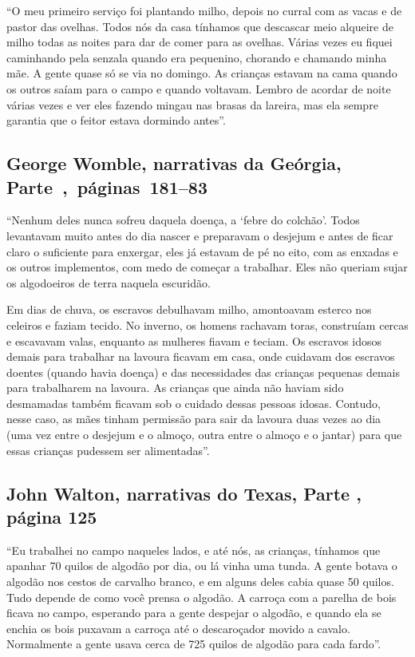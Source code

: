 ``O meu primeiro serviço foi plantando milho, depois no curral com as
vacas e de pastor das ovelhas. Todos nós da casa tínhamos que descascar
meio alqueire de milho todas as noites para dar de comer para as
ovelhas. Várias vezes eu fiquei caminhando pela senzala quando era
pequenino, chorando e chamando minha mãe. A gente quase só se via no
domingo. As crianças estavam na cama quando os outros saíam para o campo
e quando voltavam. Lembro de acordar de noite várias vezes e ver eles
fazendo mingau nas brasas da lareira, mas ela sempre garantia que o
feitor estava dormindo antes''.

\subsection{George Womble, narrativas da Geórgia, Parte~,~páginas~181--83}
\label{ref306}

``Nenhum deles nunca sofreu daquela doença, a `febre do colchão'. Todos
levantavam muito antes do dia nascer e preparavam o desjejum e antes de
ficar claro o suficiente para enxergar, eles já estavam de pé no eito,
com as enxadas e os outros implementos, com medo de começar a trabalhar.
Eles não queriam sujar os algodoeiros de terra naquela escuridão.

Em dias de chuva, os escravos debulhavam milho, amontoavam esterco nos
celeiros e faziam tecido. No inverno, os homens rachavam toras,
construíam cercas e escavavam valas, enquanto as mulheres fiavam e
teciam. Os escravos idosos demais para trabalhar na lavoura ficavam em
casa, onde cuidavam dos escravos doentes (quando havia doença) e das
necessidades das crianças pequenas demais para trabalharem na lavoura.
As crianças que ainda não haviam sido desmamadas também ficavam sob o
cuidado dessas pessoas idosas. Contudo, nesse caso, as mães tinham
permissão para sair da lavoura duas vezes ao dia (uma vez entre o
desjejum e o almoço, outra entre o almoço e o jantar) para que essas
crianças pudessem ser alimentadas''.

\subsection{John Walton, narrativas do Texas, Parte , página 125}
\label{ref273}

``Eu trabalhei no campo naqueles lados, e até nós, as crianças, tínhamos
que apanhar 70 quilos de algodão por dia, ou lá vinha uma tunda. A gente
botava o algodão nos cestos de carvalho branco, e em alguns deles cabia
quase 50 quilos. Tudo depende de como você prensa o algodão. A carroça
com a parelha de bois ficava no campo, esperando para a gente despejar o
algodão, e quando ela se enchia os bois puxavam a carroça até o
descaroçador movido a cavalo. Normalmente a gente usava cerca de 725
quilos de algodão para cada fardo''.

